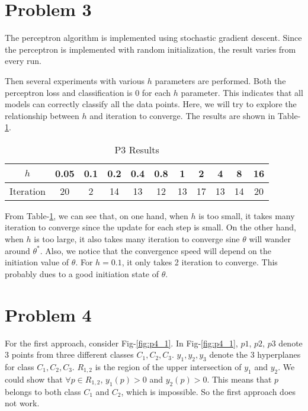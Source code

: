 \documentclass[12pt]{article}
\begin{document}
\section{Problem 3}

The perceptron algorithm is implemented using stochastic gradient descent. Since the perceptron is implemented with random initialization, the result varies from every run. 

Then several experiments with various $h$ parameters are performed. Both the perceptron loss and classification is 0 for each $h$ parameter. This indicates that all models can correctly classify all the data points. Here, we will try to explore the relationship between $h$ and iteration to converge. The results are shown in Table-\ref{tab:p3_cov}.

\begin{table}[ht!]
  \begin{center}
    \begin{tabular}{|c|c|c|c|c|c|c|c|c|c|c|}
      \hline
      $h$	  & 0.05 & 0.1 & 0.2 & 0.4 & 0.8 & 1  & 2  &  4
      	          &   8  &  16 \\ \hline
      Iteration   &  20  &  2  & 14  & 13  & 12  & 13 & 17 & 13
      		  &  14  &  20 \\ \hline
    \end{tabular}
  \end{center}
  \caption{P3 Results\label{tab:p3_cov}}
\end{table}

From Table-\ref{tab:p3_cov}, we can see that, on one hand, when $h$ is too small, it takes many iteration to converge since the update for each step is small. On the other hand, when $h$ is too large, it also takes many iteration to converge sine $\theta$ will wander around $\theta^*$. Also, we notice that the convergence speed will depend on the initiation value of $\theta$. For $h = 0.1$, it only takes 2 iteration to converge. This probably dues to a good initiation state of $\theta$.

\section{Problem 4}

For the first approach, consider Fig-\ref{fig:p4_1}. In Fig-\ref{fig:p4_1}, $p1$, $p2$, $p3$ denote 3 points from three different classes $C_1, C_2, C_3$. $y_1, y_2, y_3$ denote the 3 hyperplanes for class $C_1, C_2, C_3$. $R_{1,2}$ is the region of the upper intersection of $y_1$ and $y_2$. We could show that $\forall p \in R_{1,2}$, $y_1(p) > 0$ and $y_2(p) > 0$. This means that $p$ belongs to both class $C_1$ and $C_2$, which is impossible. So the first approach does not work.
\end{document}

